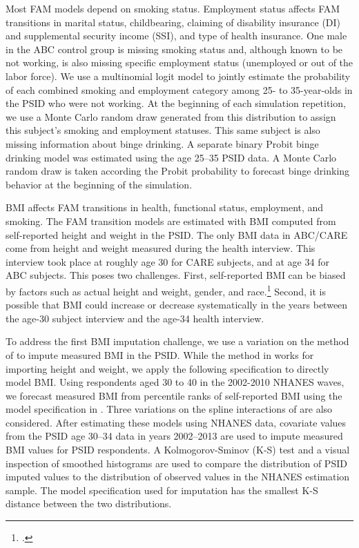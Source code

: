 \noindent Most FAM models depend on smoking status. Employment status affects FAM transitions in marital status, childbearing, claiming of disability insurance (DI) and supplemental security income (SSI), and type of health insurance.
One male in the ABC control group is missing smoking status and, although known to be not working, is also missing specific employment status (unemployed or out of the labor force).
 We use a multinomial logit model to jointly estimate the probability of each combined smoking and employment category among 25- to 35-year-olds in the PSID who were not working. At the beginning of each simulation repetition, we use a Monte Carlo random draw generated from this distribution to assign this subject's smoking and employment statuses. This same subject is also missing information about binge drinking. A separate binary Probit binge drinking model was estimated using the age 25--35 PSID data. A Monte Carlo random draw is taken according the Probit probability to forecast binge drinking behavior at the beginning of the simulation.

\noindent BMI affects FAM transitions in health, functional status, employment, and smoking.
The FAM transition models are estimated with BMI computed from self-reported height and weight in the PSID.
The only BMI data in ABC/CARE come from height and weight measured during the health interview. This interview took place at roughly age 30 for CARE subjects, and at age 34 for ABC subjects.
This poses two challenges.
First, self-reported BMI can be biased by factors such as actual height and weight, gender, and race.\footnote{\citet{Cawley_2004_JHR}.}
Second, it is possible that BMI could increase or decrease systematically in the years between the age-30 subject interview and the age-34 health interview.

\noindent To address the first BMI imputation challenge, we use a variation on the method of \citet*{Courtemanche_etal_2015_Adjusting-Body-Mass} to impute measured BMI in the PSID.
While the method in \citet{Courtemanche_etal_2015_Adjusting-Body-Mass} works for importing height and weight, we apply the following specification to directly model BMI. Using respondents aged 30 to 40 in the 2002-2010 NHANES waves, we forecast measured BMI from percentile ranks of self-reported BMI using the model specification in \citet{Courtemanche_etal_2015_Adjusting-Body-Mass}. Three variations
on the spline interactions of \citet{Courtemanche_etal_2015_Adjusting-Body-Mass} are also considered. After estimating these models using NHANES data, covariate values from the PSID
age 30--34 data in years 2002--2013 are used to impute measured BMI values for PSID respondents. A Kolmogorov-Sminov (K-S) test and a visual inspection of smoothed histograms are used to compare the distribution of PSID imputed values to the distribution of observed values in the NHANES estimation sample. The model specification used for imputation has the smallest K-S distance between the two distributions.

